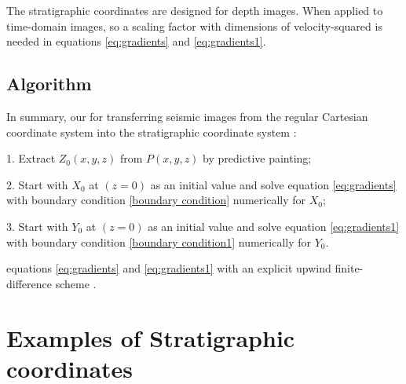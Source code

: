The stratigraphic coordinates are  designed for depth images. When applied to time-domain images, so a scaling factor with dimensions of velocity-squared is needed in equations \ref{eq:gradients} and \ref{eq:gradients1}.

\subsection{Algorithm}

In summary, our  for transferring seismic images from the regular Cartesian coordinate system into the stratigraphic coordinate system :

1. Extract  $Z_0\left(x,y,z\right)$ from  $P\left( x,y,z \right)$  by predictive painting; 

2. Start with $X_0$ at $\left(z = 0\right)$ as an initial value and solve equation \ref{eq:gradients} with boundary condition \ref{boundary condition} numerically for $X_0$;

3. Start with $Y_0$ at $\left(z = 0\right)$ as an initial value and solve equation \ref{eq:gradients1} with boundary condition \ref{boundary condition1} numerically for $Y_0$.

 equations \ref{eq:gradients} and \ref{eq:gradients1}  with an explicit upwind finite-difference scheme \cite[]{franklin2001,li2013}.


\section{ Examples of Stratigraphic coordinates}

